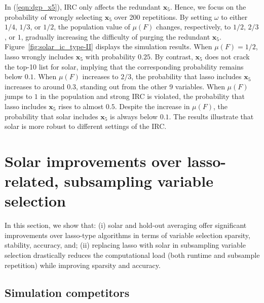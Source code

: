 \documentclass[11pt,review,authoryear]{elsarticle}
\begin{document}
In (\ref{eqn:dgp_x5}), IRC only affects the redundant $\mathbf{x}_5$. Hence, we focus on the probability of wrongly selecting $\mathbf{x}_5$ over 200 repetitions. By setting $\omega$ to either $1/4$, $1/3$, or $1/2$, the population value of $\mu \left( F \right)$ changes, respectively, to $1/2$, $2/3$, or $1$, gradually increasing the difficulty of purging the redundant $\mathbf{x}_5$. Figure~\ref{fig:solar_ic_type-II} displays the simulation results. When $\mu \left( F \right) = 1/2$, lasso wrongly includes $\mathbf{x}_5$ with probability $0.25$. By contrast, $\mathbf{x}_5$ does not crack the top-10 list for solar, implying that the corresponding probability remains below $0.1$. When $\mu \left( F \right)$ increases to $2/3$, the probability that lasso includes $\mathbf{x}_5$ increases to around $0.3$, standing out from the other 9 variables. When $\mu \left( F \right)$ jumps to $1$ in the population and strong IRC is violated, the probability that lasso includes $\mathbf{x}_5$ rises to almost $0.5$. Despite the increase in $\mu\left(F\right)$, the probability that solar includes $\mathbf{x}_5$ is always below $0.1$. The results illustrate that solar is more robust to different settings of the IRC.



\section{Solar improvements over lasso-related, subsampling variable selection\label{section:comp}}

In this section, we show that: (i) solar and hold-out averaging offer significant improvements over lasso-type algorithms in terms of variable selection sparsity, stability, accuracy, and; (ii) replacing lasso with solar in subsampling variable selection drastically reduces the computational load (both runtime and subsample repetition) while improving sparsity and accuracy.

\subsection{Simulation competitors}
\end{document}
